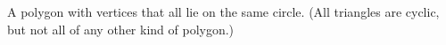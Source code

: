 A polygon with vertices that all lie on the same circle.
(All triangles are cyclic, but not all of any other kind
of polygon.)